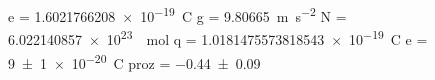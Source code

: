 e = \SI[]{1.6021766208e-19}{\coulomb}
g = \SI[]{9.80665}{\meter\per\second\squared}
N = \SI[]{6.022140857e+23}{\per\mole}
q = \SI[]{1.0181475573818543e-19}{\coulomb}
e = \SI{+9(1)e-20}{\coulomb}
proz = \SI{-0.44(9)}{}

